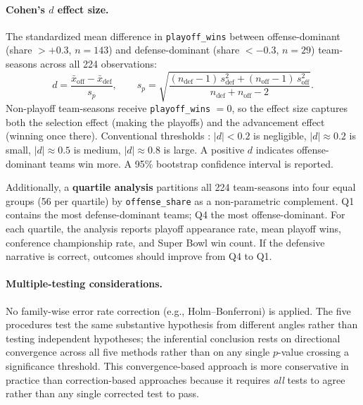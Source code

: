 \documentclass[12pt,a4paper]{article}
\begin{document}
\paragraph{Cohen's $d$ effect size.} The standardized mean difference in \texttt{playoff\_wins} between offense-dominant (share $> +0.3$, $n = 143$) and defense-dominant (share $< -0.3$, $n = 29$) team-seasons across all 224 observations:
\begin{equation}
  \label{eq:cohens-d}
  d = \frac{\bar{x}_{\mathrm{off}} - \bar{x}_{\mathrm{def}}}{s_p},
  \qquad
  s_p = \sqrt{\frac{(n_{\mathrm{def}} - 1)\,s_{\mathrm{def}}^2
                    + (n_{\mathrm{off}} - 1)\,s_{\mathrm{off}}^2}
                   {n_{\mathrm{def}} + n_{\mathrm{off}} - 2}}.
\end{equation}
Non-playoff team-seasons receive \texttt{playoff\_wins} $= 0$, so the effect size captures both the selection effect (making the playoffs) and the advancement effect (winning once there). Conventional thresholds \citep{cohen1988statisticalpower}: $|d| < 0.2$ is negligible, $|d| \approx 0.2$ is small, $|d| \approx 0.5$ is medium, $|d| \approx 0.8$ is large. A positive $d$ indicates offense-dominant teams win more. A 95\% bootstrap confidence interval is reported.

Additionally, a \textbf{quartile analysis} partitions all 224 team-seasons into four equal groups (56 per quartile) by \texttt{offense\_share} as a non-parametric complement. Q1 contains the most defense-dominant teams; Q4 the most offense-dominant. For each quartile, the analysis reports playoff appearance rate, mean playoff wins, conference championship rate, and Super Bowl win count. If the defensive narrative is correct, outcomes should improve from Q4 to Q1.

\paragraph{Multiple-testing considerations.} No family-wise error rate correction (e.g., Holm--Bonferroni) is applied. The five procedures test the same substantive hypothesis from different angles rather than testing independent hypotheses; the inferential conclusion rests on directional convergence across all five methods rather than on any single $p$-value crossing a significance threshold. This convergence-based approach is more conservative in practice than correction-based approaches because it requires \emph{all} tests to agree rather than any single corrected test to pass.
\end{document}
